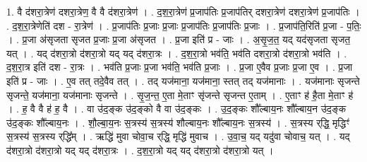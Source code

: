 \documentclass[17pt]{extarticle}
\begin{document}
1. वै द॑शरा॒त्रेण॑ दशरा॒त्रेण॒ वै वै द॑शरा॒त्रेण॑ । . द॒श॒रा॒त्रेण॑ प्र॒जाप॑तिः प्र॒जाप॑तिर् दशरा॒त्रेण॑ दशरा॒त्रेण॑ प्र॒जाप॑तिः । . द॒श॒रा॒त्रेणेति॑ दश - रा॒त्रेण॑ । . प्र॒जाप॑तिः प्र॒जाः प्र॒जाः प्र॒जाप॑तिः प्र॒जाप॑तिः प्र॒जाः । . प्र॒जाप॑ति॒रिति॑ प्र॒जा - प॒तिः॒ । . प्र॒जा अ॑सृजता सृजत प्र॒जाः प्र॒जा अ॑सृजत । . प्र॒जा इति॑ प्र - जाः । . अ॒सृ॒ज॒त॒ यद् यद॑सृजता सृजत॒ यत् । . यद् द॑शरा॒त्रो द॑शरा॒त्रो यद् यद् द॑शरा॒त्रः । . द॒श॒रा॒त्रो भव॑ति॒ भव॑ति दशरा॒त्रो द॑शरा॒त्रो भव॑ति । . द॒श॒रा॒त्र इति॑ दश - रा॒त्रः । . भव॑ति प्र॒जाः प्र॒जा भव॑ति॒ भव॑ति प्र॒जाः । . प्र॒जा ए॒वैव प्र॒जाः प्र॒जा ए॒व । . प्र॒जा इति॑ प्र - जाः । . ए॒व तत् तदे॒वैव तत् । . तद् यज॑माना॒ यज॑माना॒ स्तत् तद् यज॑मानाः । . यज॑मानाः सृजन्ते सृजन्ते॒ यज॑माना॒ यज॑मानाः सृजन्ते । . सृ॒ज॒न्त॒ ए॒ता मे॒ताꣳ सृ॑जन्ते सृजन्त ए॒ताम् । . ए॒ताꣳ ह॑ है॒ता मे॒ताꣳ ह॑ । . ह॒ वै वै ह॑ ह॒ वै । . वा उ॑द॒ङ्क उ॑द॒ङ्को वै वा उ॑द॒ङ्कः । . उ॒द॒ङ्कः शौ᳚ल्बाय॒नः शौ᳚ल्बाय॒न उ॑द॒ङ्क उ॑द॒ङ्कः शौ᳚ल्बाय॒नः । . शौ॒ल्बा॒य॒नः स॒त्रस्य॑ स॒त्रस्य॑ शौल्बाय॒नः शौ᳚ल्बाय॒नः स॒त्रस्य॑ । . स॒त्रस्य र्‌द्धि॒ मृद्धिꣳ॑ स॒त्रस्य॑ स॒त्रस्य र्‌द्धि᳚म् । . ऋद्धि॑ मुवा चोवा॒च र्‌द्धि॒ मृद्धि॑ मुवाच । . उ॒वा॒च॒ यद् यदु॑वा चोवाच॒ यत् । . यद् द॑शरा॒त्रो द॑शरा॒त्रो यद् यद् द॑शरा॒त्रः । . द॒श॒रा॒त्रो यद् यद् द॑शरा॒त्रो द॑शरा॒त्रो यत् । \newline
\end{document}
